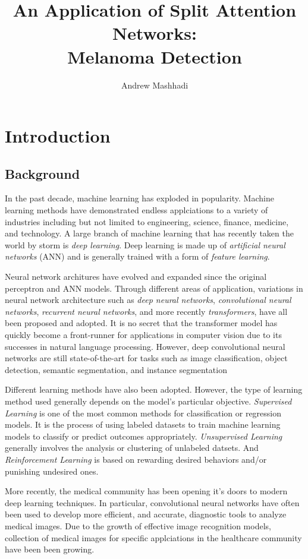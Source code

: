 \documentclass [MAS] {uclathes}
\title          {An Application of Split Attention Networks:\\
                Melanoma Detection}
\author         {Andrew Mashhadi}
\begin{document}
\makeintropages


\chapter{Introduction}

\section{Background}

In the past decade, machine learning has exploded in popularity. Machine learning methods have demonstrated endless applciations to a variety of industries including but not limited to engineering, science, finance, medicine, and technology. A large branch of machine learning that has recently taken the world by storm is \textit{deep learning}. Deep learning is made up of \textit{artificial neural networks} (ANN) and is generally trained with a form of \textit{feature learning}. 

Neural network architures have evolved and expanded since the original perceptron and ANN models. Through different areas of application, variations in neural network architecture such as \textit{deep neural networks}, \textit{convolutional neural networks}, \textit{recurrent neural networks}, and more recently \textit{transformers}, have all been proposed and adopted. It is no secret that the transformer model has quickly become a front-runner for applications in computer vision due to its successes in natural language processing. However, deep convolutional neural networks are still state-of-the-art for tasks such as image classification, object detection, semantic segmentation, and instance segmentation

Different learning methods have also been adopted. However, the type of learning method used generally depends on the model's particular objective. \textit{Supervised Learning} is one of the most common methods for classification or regression models. It is the process of using labeled datasets to train machine learning models to classify or predict outcomes appropriately. \textit{Unsupervised Learning} generally involves the analysis or clustering of unlabeled datsets. And \textit{Reinforcement Learning} is based on rewarding desired behaviors and/or punishing undesired ones.

More recently, the medical community has been opening it's doors to modern deep learning techniques. In particular, convolutional neural networks have often been used to develop more efficient, and accurate, diagnostic tools to analyze medical images. Due to the growth of effective image recognition models, collection of medical images for specific applciations in the healthcare community have been been growing. 
\end{document}
